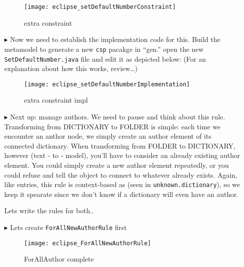 \begin{itemize}
\begin{figure}[htbp]
\begin{center}
  \texttt{[image: eclipse\_setDefaultNumberConstraint]}
  \caption{extra constraint}
  \label{eclipse:newEntryConstraint}
\end{center}
\end{figure}

\item[$\blacktriangleright$] Now we need to establish the implementation code for this. Build the metamodel to generate a new \texttt{csp} pacakge in ``gen.''
open the new \texttt{SetDefaultNumber.java} file and edit it as depicted below: (For an explanation about how this works, review\ldots)

\begin{figure}[htbp]
\begin{center}
  \texttt{[image: eclipse\_setDefaultNumberImplementation]}
  \caption{extra constraint impl}
  \label{eclipse:setDefaultImpl}
\end{center}
\end{figure}

\item[$\blacktriangleright$] Next up: manage authors. We need to pause and think about this rule. Transforming from DICTIONARY to FOLDER is simple: each time
we encounter an anthor node, we simply create an author element of its connected dictionary. When transforming from FOLDER to DICTIONARY, however (text - to -
model), you'll have to consider an already existing author element. You could simply create a new author element repeatedly, or you could refuse and tell
the object to connect to whatever already exists. Again, like entries, this rule is context-based as (seen in \texttt{unknown.dictionary}), so we keep it
spearate since we don't know if a dictionary will even have an author.

Lets write the rules for both..

\item[$\blacktriangleright$] Lets create \texttt{ForAllNewAuthorRule} first

\begin{figure}[htbp]
\begin{center}
  \texttt{[image: eclipse\_ForAllNewAuthorRule]}
  \caption{ForAllAuthor complete}
  \label{eclipse:ForAllNewAuthorRule}
\end{center}
\end{figure}


\end{itemize}
